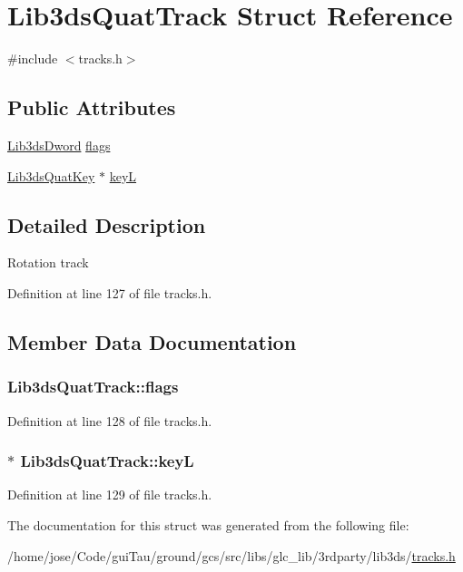 \hypertarget{struct_lib3ds_quat_track}{\section{Lib3ds\-Quat\-Track Struct Reference}
\label{struct_lib3ds_quat_track}
}


{\ttfamily \#include $<$tracks.\-h$>$}

\subsection*{Public Attributes}
\begin{DoxyCompactItemize}
\item 
\hyperlink{types_8h_a299c9663303144c562f6bd92c2f273d3}{Lib3ds\-Dword} \hyperlink{struct_lib3ds_quat_track_a9b5015ff6a60d08e059120ddd19f57dc}{flags}
\item 
\hyperlink{struct_lib3ds_quat_key}{Lib3ds\-Quat\-Key} $\ast$ \hyperlink{struct_lib3ds_quat_track_a99368e68955a2591d9c3c87ac8073f9b}{key\-L}
\end{DoxyCompactItemize}


\subsection{Detailed Description}
Rotation track 

Definition at line 127 of file tracks.\-h.



\subsection{Member Data Documentation}
\hypertarget{struct_lib3ds_quat_track_a9b5015ff6a60d08e059120ddd19f57dc}{
\subsubsection[{flags}]{ Lib3ds\-Quat\-Track\-::flags}}\label{struct_lib3ds_quat_track_a9b5015ff6a60d08e059120ddd19f57dc}


Definition at line 128 of file tracks.\-h.

\hypertarget{struct_lib3ds_quat_track_a99368e68955a2591d9c3c87ac8073f9b}{
\subsubsection[{key\-L}]{$\ast$ Lib3ds\-Quat\-Track\-::key\-L}}\label{struct_lib3ds_quat_track_a99368e68955a2591d9c3c87ac8073f9b}


Definition at line 129 of file tracks.\-h.



The documentation for this struct was generated from the following file\-:\begin{DoxyCompactItemize}
\item 
/home/jose/\-Code/gui\-Tau/ground/gcs/src/libs/glc\-\_\-lib/3rdparty/lib3ds/\hyperlink{tracks_8h}{tracks.\-h}\end{DoxyCompactItemize}

